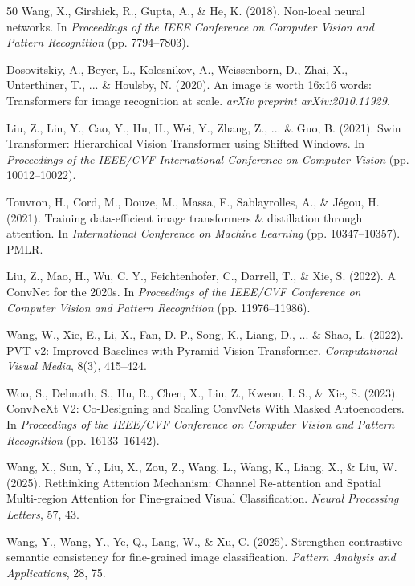 \documentclass[pdflatex,sn-mathphys-num]{sn-jnl}
\theoremstyle{thmstyleone}%
\theoremstyle{thmstyletwo}%
\theoremstyle{thmstylethree}%
\begin{document}
\begin{thebibliography}{50}
     Wang, X., Girshick, R., Gupta, A., \& He, K. (2018). Non-local neural networks. In \textit{Proceedings of the IEEE Conference on Computer Vision and Pattern Recognition} (pp. 7794--7803).
    
     Dosovitskiy, A., Beyer, L., Kolesnikov, A., Weissenborn, D., Zhai, X., Unterthiner, T., ... \& Houlsby, N. (2020). An image is worth 16x16 words: Transformers for image recognition at scale. \textit{arXiv preprint arXiv:2010.11929}.
    
     Liu, Z., Lin, Y., Cao, Y., Hu, H., Wei, Y., Zhang, Z., ... \& Guo, B. (2021). Swin Transformer: Hierarchical Vision Transformer using Shifted Windows. In \textit{Proceedings of the IEEE/CVF International Conference on Computer Vision} (pp. 10012--10022).
    
     Touvron, H., Cord, M., Douze, M., Massa, F., Sablayrolles, A., \& Jégou, H. (2021). Training data-efficient image transformers \& distillation through attention. In \textit{International Conference on Machine Learning} (pp. 10347--10357). PMLR.
    
     Liu, Z., Mao, H., Wu, C. Y., Feichtenhofer, C., Darrell, T., \& Xie, S. (2022). A ConvNet for the 2020s. In \textit{Proceedings of the IEEE/CVF Conference on Computer Vision and Pattern Recognition} (pp. 11976--11986).
    
     Wang, W., Xie, E., Li, X., Fan, D. P., Song, K., Liang, D., ... \& Shao, L. (2022). PVT v2: Improved Baselines with Pyramid Vision Transformer. \textit{Computational Visual Media}, 8(3), 415--424.
    
     Woo, S., Debnath, S., Hu, R., Chen, X., Liu, Z., Kweon, I. S., \& Xie, S. (2023). ConvNeXt V2: Co-Designing and Scaling ConvNets With Masked Autoencoders. In \textit{Proceedings of the IEEE/CVF Conference on Computer Vision and Pattern Recognition} (pp. 16133--16142).
    
     Wang, X., Sun, Y., Liu, X., Zou, Z., Wang, L., Wang, K., Liang, X., \& Liu, W. (2025). Rethinking Attention Mechanism: Channel Re-attention and Spatial Multi-region Attention for Fine-grained Visual Classification. \textit{Neural Processing Letters}, 57, 43.
    
     Wang, Y., Wang, Y., Ye, Q., Lang, W., \& Xu, C. (2025). Strengthen contrastive semantic consistency for fine-grained image classification. \textit{Pattern Analysis and Applications}, 28, 75.
    

\end{thebibliography}
\end{document}
